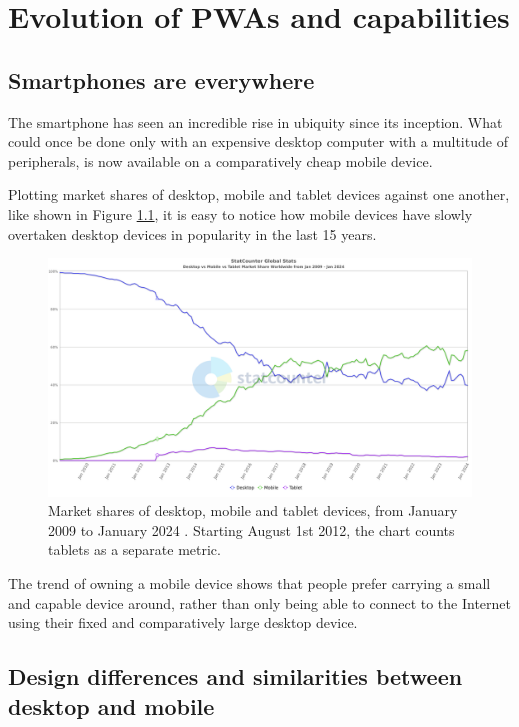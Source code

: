 \chapter{Evolution of PWAs and capabilities}

\section{Smartphones are everywhere}

The smartphone has seen an incredible rise in ubiquity since its inception. What could once be done only with an expensive desktop computer with a multitude of peripherals, is now available on a comparatively cheap mobile device.

Plotting market shares of desktop, mobile and tablet devices against one another, like shown in Figure \ref{FigStatCounterDMT}, it is easy to notice how mobile devices have slowly overtaken desktop devices in popularity in the last 15 years.

\begin{figure}[htbp]
    \centering
    \includegraphics[width=\textwidth]{./figures/ch1_desktop-vs-mobile.png}
    \caption{Market shares of desktop, mobile and tablet devices, from January 2009 to January 2024 \cite{StatCountDMT}. Starting August 1st 2012, the chart counts tablets as a separate metric.}
    \label{FigStatCounterDMT}
\end{figure}

The trend of owning a mobile device shows that people prefer carrying a small and capable device around, rather than only being able to connect to the Internet using their fixed and comparatively large desktop device.

\section{Design differences and similarities between desktop and mobile}

